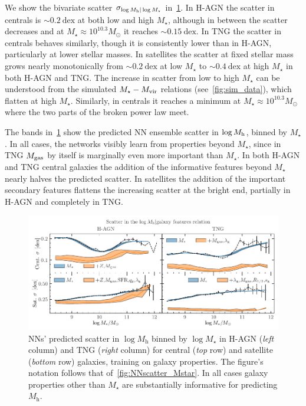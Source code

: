 \documentclass[usenatbib,useAMS]{mnras}
\begin{document}
We show the bivariate scatter $\sigma_{\log M_{\rm h} | \log M_\star}$ in~\cref{fig:NNscatter_Mvir}. In H-AGN the scatter in centrals is $\sim0.2~\mathrm{dex}$ at both low and high $M_\star$, although in between the scatter decreases and at $M_\star\approx 10^{10.3} M_\odot$ it reaches $\sim0.15~\mathrm{dex}$. In TNG the scatter in centrals behaves similarly, though it is consistently lower than in H-AGN, particularly at lower stellar masses. In satellites the scatter at fixed stellar mass grows nearly monotonically from $\sim0.2~\mathrm{dex}$ at low $M_\star$ to $\sim0.4~\mathrm{dex}$ at high $M_\star$ in both H-AGN and TNG. The increase in scatter from low to high $M_\star$ can be understood from the simulated $M_\star - M_{\rm vir}$ relations (see~\cref{fig:sim_data}), which flatten at high $M_\star$. Similarly, in centrals it reaches a minimum at $M_\star \approx 10^{10.3} M_\odot$ where the two parts of the broken power law meet.

The bands in~\cref{fig:NNscatter_Mvir} show the predicted NN ensemble scatter in $\log M_{\rm h}$, binned by $M_\star$. In all cases, the networks visibly learn from properties beyond $M_\star$, since in TNG $M_{\rm gas}$ by itself is marginally even more important than $M_{\star}$. In both H-AGN and TNG central galaxies the addition of the informative features beyond $M_\star$ nearly halves the predicted scatter. In satellites the addition of the important secondary features flattens the increasing scatter at the bright end, partially in H-AGN and completely in TNG.


\begin{figure}
    \centering
    \includegraphics[width=\textwidth]{Figures/NN_scatter_Mvir.pdf}
    \caption{\acp{NN}' predicted scatter in $\log M_\mathrm{h}$ binned by $\log M_\star$ in H-AGN (\emph{left} column) and TNG (\emph{right} column) for central (\emph{top} row) and satellite (\emph{bottom} row) galaxies, training on galaxy properties. The figure's notation follows that of~\cref{fig:NNscatter_Mstar}. In all cases galaxy properties other than $M_\star$ are substantially informative for predicting $M_\text{h}$.
    }
    \label{fig:NNscatter_Mvir}
\end{figure}
\end{document}
